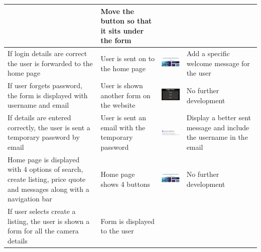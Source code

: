 \begin{center}
\begin{longtable}{|P{30mm}|P{20mm}|P{60mm}|P{25mm}|}
& Move the button so that it sits under the form \\ \hline
If login details are correct the user is forwarded to the home page &
User is sent on to the home page &
\includegraphics[width=57mm]{ch4_testing_for_eval/media/image6.png} &
Add a specific welcome message for the user \\ \hline
If user forgets password, the form is displayed with username and email
& User is shown another form on the website &
\includegraphics[width=57mm]{ch4_testing_for_eval/media/image12.png}
& No further development \\ \hline
If details are entered correctly, the user is sent a temporary password
by email & User is sent an email with the temporary password &
\includegraphics[width=57mm]{ch4_testing_for_eval/media/image47.png}
& Display a better sent message and include the username in the email \\ \hline
Home page is displayed with 4 options of search, create listing, price
quote and messages along with a navigation bar & Home page shows 4
buttons &
\includegraphics[width=57mm]{ch4_testing_for_eval/media/image6.png} &
No further development \\ \hline
If user selects create a listing, the user is shown a form for all the
camera details & Form is displayed to the user &

\end{longtable}
\end{center}
